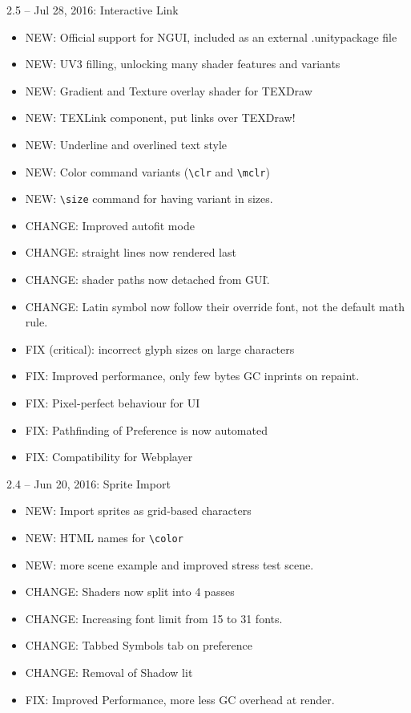 \documentclass[12pt]{article}
\begin{document}
2.5 – Jul 28, 2016: Interactive Link
\begin{itemize}
\item NEW: Official support for NGUI, included as an external .unitypackage file
\item NEW: UV3 filling, unlocking many shader features and variants
\item NEW: Gradient and Texture overlay shader for TEXDraw
\item NEW: TEXLink component, put links over TEXDraw!
\item NEW: Underline and overlined text style
\item NEW: Color command variants (\verb|\clr| and \verb|\mclr|)
\item NEW: \verb|\size| command for having variant in sizes.
\item CHANGE: Improved autofit mode
\item CHANGE: straight lines now rendered last
\item CHANGE: shader paths now detached from GUI\..
\item CHANGE: Latin symbol now follow their override font, not the default math rule.
\item FIX (critical): incorrect glyph sizes on large characters
\item FIX: Improved performance, only few bytes GC inprints on repaint.
\item FIX: Pixel-perfect behaviour for UI
\item FIX: Pathfinding of  Preference is now automated
\item FIX: Compatibility for Webplayer
\end{itemize}

2.4 – Jun 20, 2016: Sprite Import
\begin{itemize}
\item NEW: Import sprites as grid-based characters
\item NEW: HTML names for \verb|\color|
\item NEW: more scene example and improved stress test scene.
\item CHANGE: Shaders now split into 4 passes
\item CHANGE: Increasing font limit from 15 to 31 fonts.
\item CHANGE: Tabbed Symbols tab on preference
\item CHANGE: Removal of Shadow lit
\item FIX: Improved Performance, more less GC overhead at render.
\end{itemize}
\end{document}

